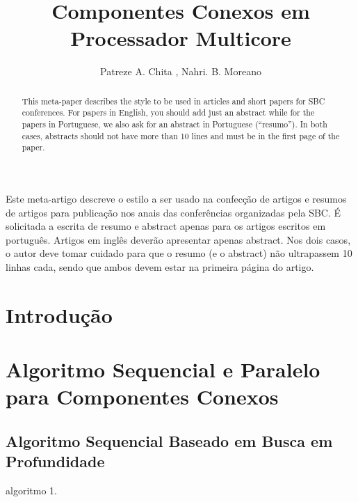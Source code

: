 \documentclass[12pt]{article}
\title{Componentes Conexos em Processador Multicore}
\author{Patreze A. Chita \inst{1}, Nahri. B. Moreano\inst{1}}
\begin{document}
 

\maketitle

\begin{abstract}
  This meta-paper describes the style to be used in articles and short papers
  for SBC conferences. For papers in English, you should add just an abstract
  while for the papers in Portuguese, we also ask for an abstract in
  Portuguese (``resumo''). In both cases, abstracts should not have more than
  10 lines and must be in the first page of the paper.
\end{abstract}
     
\begin{resumo} 
  Este meta-artigo descreve o estilo a ser usado na confecção de artigos e
  resumos de artigos para publicação nos anais das conferências organizadas
  pela SBC. É solicitada a escrita de resumo e abstract apenas para os artigos
  escritos em português. Artigos em inglês deverão apresentar apenas abstract.
  Nos dois casos, o autor deve tomar cuidado para que o resumo (e o abstract)
  não ultrapassem 10 linhas cada, sendo que ambos devem estar na primeira
  página do artigo.
\end{resumo}

\section{Introdução}
\lipsum[1]

\section{Algoritmo Sequencial e Paralelo para Componentes Conexos}
\lipsum[1]
\subsection{Algoritmo Sequencial Baseado em Busca em Profundidade}

algoritmo 1.
\end{document}
